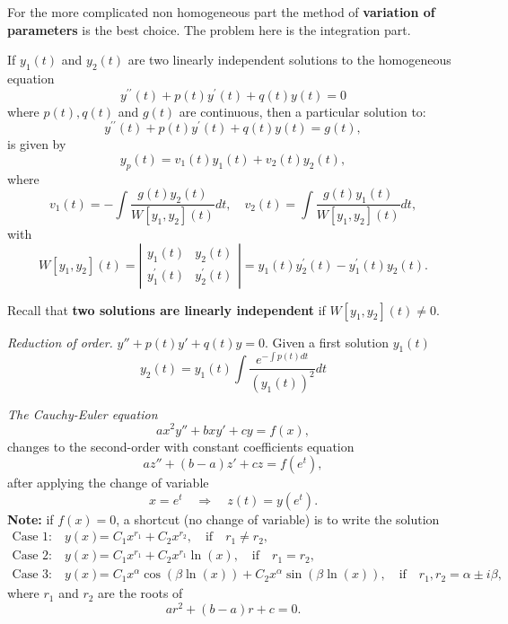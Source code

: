 \documentclass[11pt]{article}
\begin{document}
\begin{preamble}
\begin{formulaitem}
\item For the more complicated non homogeneous part the method of \textbf{variation of parameters} is the best choice. The problem here is the integration part.

If $y_{1}(t)$ and $y_{2}(t)$ are two linearly independent solutions to the homogeneous equation
\begin{equation*}\label{formula: homogenous equation}
y^{\prime \prime}(t) + p(t)y^{\prime}(t)+q(t)y(t) = 0
\end{equation*}
where $p(t),q(t)$ and $g(t)$ are continuous, then a particular solution to:
\begin{equation*}\label{formula: particular equation}
y^{\prime \prime}(t) + p(t)y^{\prime}(t)+q(t)y(t) = g(t),
\end{equation*}
is given by \[y_{p}(t) = v_{1}(t) y_{1}(t) + v_{2}(t) y_{2}(t),\] where 
\begin{equation*}\label{formula: system solution}
v_{1}(t) = - \int \dfrac{g(t) y_{2}(t)}{W[y_{1},y_{2}](t)} dt, \quad v_{2}(t) =  \int \dfrac{g(t) y_{1}(t)}{W[y_{1},y_{2}](t)} dt,
\end{equation*}
with 
\[W[y_{1},y_{2}](t) = \left| \begin{array}{cc} y_{1}(t) & y_{2}(t) \\
y_{1}^{\prime}(t) & y_{2}^{\prime}(t) \end{array} \right| =  y_{1}(t)y_{2}^{\prime}(t)-y_{1}^{\prime}(t)y_{2}(t).\]

Recall that \textbf{two solutions are linearly independent} if  $W[y_{1},y_{2}](t)\neq 0$.


\item \textsl{Reduction of order.} $y''+p(t)y'+q(t)y=0$. Given a first solution $y_{1}(t)$
\[\boxed{y_{2}(t)=y_{1}(t)\int\frac{e^{-\int p(t) dt}}{(y_{1}(t))^{2}}dt}\]

\item \textsl{The Cauchy-Euler equation} \[a x^{2}y'' +bxy' + c y = f(x),\] changes to the second-order with constant coefficients equation \[az'' +(b-a)z'+cz=f(e^{t}),\] after applying the change of variable \[x = e^{t} \quad \Rightarrow \quad z(t) = y(e^{t}).\]
\textbf{Note:} if $f(x)=0$, a shortcut (no change of variable) is to write the solution 
\begin{align*}
\text{Case 1:} \quad y(x)&=C_{1}x^{r_{1}}+C_{2}x^{r_{2}}, \quad \text{if}\quad r_{1}\neq r_{2}, \\
\text{Case 2:} \quad y(x)&=C_{1}x^{r_{1}}+C_{2}x^{r_{1}}\ln (x), \quad \text{if}\quad r_{1}= r_{2}, \\
\text{Case 3:} \quad y(x)&=C_{1}x^{\alpha}\cos(\beta \ln (x) )+C_{2}x^{\alpha}\sin(\beta \ln (x) ), \quad \text{if}\quad r_{1}, r_{2} = \alpha \pm i \beta,
\end{align*}
where $r_{1}$ and $r_{2}$ are the roots of \[ar^{2}+(b-a)r+c=0.\]

\end{formulaitem}
\end{preamble}
\end{document}
